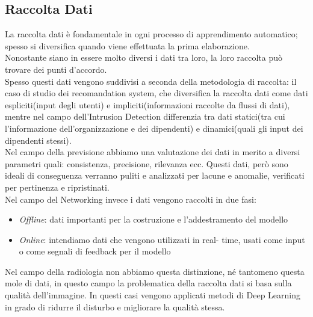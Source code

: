 \documentclass[../tesi.tex]{subfiles}
\begin{document}
\subsection{Raccolta Dati}
La raccolta dati è fondamentale in ogni processo di apprendimento automatico; spesso si diversifica quando viene effettuata la prima elaborazione.\\
Nonostante siano in essere molto diversi i dati tra loro, la loro raccolta può trovare dei punti d’accordo.\\
Spesso questi dati vengono suddivisi a seconda della metodologia di raccolta: il caso di studio dei recomandation system, che diversifica la raccolta dati come dati espliciti(input degli utenti) e impliciti(informazioni raccolte da flussi di dati), mentre nel campo dell’Intrusion Detection differenzia tra dati statici(tra cui l’informazione dell’organizzazione e dei dipendenti) e dinamici(quali gli input dei dipendenti stessi).\\
Nel campo della previsione abbiamo una valutazione dei dati in merito a diversi parametri quali: consistenza, precisione, rilevanza ecc. Questi dati, però sono ideali di conseguenza verranno puliti e analizzati per lacune e anomalie, verificati per pertinenza e ripristinati.\\
Nel campo del Networking invece i dati vengono raccolti in due fasi:
\begin{itemize}
  \item \textit{Offline}: dati importanti per la costruzione e l’addestramento del modello 
  \item \textit{Online}: intendiamo dati che vengono utilizzati in real- time, usati come input o come segnali di feedback per il modello
\end{itemize}
Nel campo della radiologia non abbiamo questa distinzione, né tantomeno questa mole di dati, in questo campo la problematica della raccolta dati si basa sulla qualità dell’immagine. In questi casi vengono applicati metodi di \Gls{Deep Learning} in grado di ridurre il disturbo e migliorare la qualità stessa.
\end{document}
